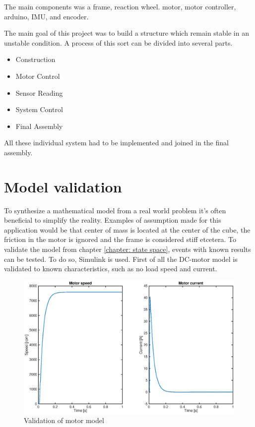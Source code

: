 \documentclass[a4paper,11pt]{kth-mag}
\begin{document}
The main components was a frame, reaction wheel. motor, motor controller, arduino, IMU, 
and encoder.  

The main goal of this project was to build a structure which remain stable in an unstable condition. A process of this sort can be divided into several parts. 
\begin{itemize}
\item Construction
\item Motor Control
\item Sensor Reading
\item System Control
\item Final Assembly
\end{itemize}
All these individual system had to be implemented and joined in the final assembly.
\section{Model validation}
To synthesize a mathematical model from a real world problem it's often beneficial to simplify the reality. Examples of assumption made for this application would be that center of mass is located at the center of the cube, the friction in the motor is ignored and the frame is considered stiff etcetera. 
To validate the model from chapter \ref{chapter: state space}, events with known results can be tested. To do so, Simulink \cite{MATLAB:2014} is used.
First of all the DC-motor model is validated to known characteristics, such as no load speed and current. 

\begin{figure}[!htb] 
\centering
\includegraphics[width = \textwidth]{Motor_noload.eps}
\caption{Validation of motor model}
\label{fig:Motor noload}
\end{figure}
\end{document}
